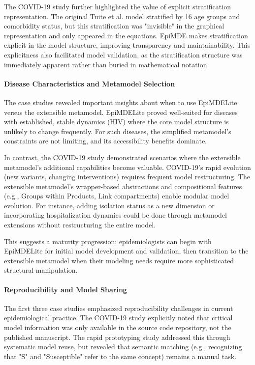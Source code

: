 The COVID-19 study further highlighted the value of explicit stratification representation. The original Tuite et al. model stratified by 16 age groups and comorbidity status, but this stratification was "invisible" in the graphical representation and only appeared in the equations. EpiMDE makes stratification explicit in the model structure, improving transparency and maintainability. This explicitness also facilitated model validation, as the stratification structure was immediately apparent rather than buried in mathematical notation.

\paragraph{Disease Characteristics and Metamodel Selection}

The case studies revealed important insights about when to use EpiMDELite versus the extensible metamodel. EpiMDELite proved well-suited for diseases with established, stable dynamics (HIV) where the core model structure is unlikely to change frequently. For such diseases, the simplified metamodel's constraints are not limiting, and its accessibility benefits dominate.

In contrast, the COVID-19 study demonstrated scenarios where the extensible metamodel's additional capabilities become valuable. COVID-19's rapid evolution (new variants, changing interventions) requires frequent model restructuring. The extensible metamodel's wrapper-based abstractions and compositional features (e.g., Groups within Products, Link compartments) enable modular model evolution. For instance, adding isolation status as a new dimension or incorporating hospitalization dynamics could be done through metamodel extensions without restructuring the entire model.

This suggests a maturity progression: epidemiologists can begin with EpiMDELite for initial model development and validation, then transition to the extensible metamodel when their modeling needs require more sophisticated structural manipulation.

\paragraph{Reproducibility and Model Sharing}

The first three case studies emphasized reproducibility challenges in current epidemiological practice. The COVID-19 study explicitly noted that critical model information was only available in the source code repository, not the published manuscript. The rapid prototyping study addressed this through systematic model reuse, but revealed that semantic matching (e.g., recognizing that "S" and "Susceptible" refer to the same concept) remains a manual task.

